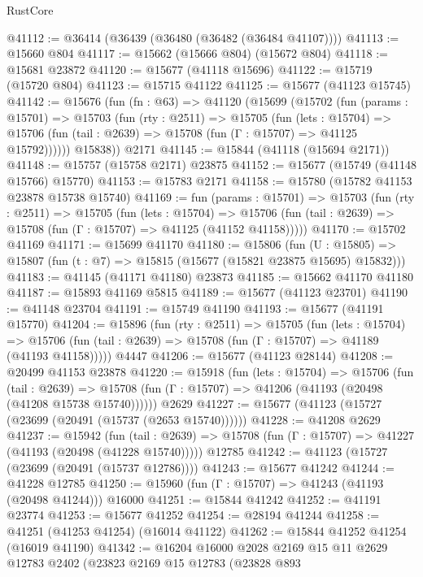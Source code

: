 \begin{lexlean}{RustCore}
\begin{coremodule}
@41112 := @36414 (@36439 (@36480 (@36482 (@36484 @41107))))
@41113 := @15660 @804
@41117 := @15662 (@15666 @804) (@15672 @804)
@41118 := @15681 @23872
@41120 := @15677 (@41118 @15696)
@41122 := @15719 (@15720 @804)
@41123 := @15715 @41122
@41125 := @15677 (@41123 @15745)
@41142 := @15676
    (fun (fn : @63) =>
    @41120
      (@15699
        (@15702
          (fun (params : @15701) =>
          @15703
            (fun (rty : @2511) =>
            @15705
              (fun (lets : @15704) =>
              @15706 (fun (tail : @2639) => @15708 (fun (Γ : @15707) => @41125 @15792))))))
        @15838))
    @2171
@41145 := @15844 (@41118 (@15694 @2171))
@41148 := @15757 (@15758 @2171) @23875
@41152 := @15677 (@15749 (@41148 @15766) @15770)
@41153 := @15783 @2171
@41158 := @15780 (@15782 @41153 @23878 @15738 @15740)
@41169 := fun (params : @15701) =>
  @15703
    (fun (rty : @2511) =>
    @15705
      (fun (lets : @15704) =>
      @15706 (fun (tail : @2639) => @15708 (fun (Γ : @15707) => @41125 (@41152 @41158)))))
@41170 := @15702 @41169
@41171 := @15699 @41170
@41180 := @15806
    (fun (U : @15805) => @15807 (fun (t : @7) => @15815 (@15677 (@15821 @23875 @15695) @15832)))
@41183 := @41145 (@41171 @41180) @23873
@41185 := @15662 @41170 @41180
@41187 := @15893 @41169 @5815
@41189 := @15677 (@41123 @23701)
@41190 := @41148 @23704
@41191 := @15749 @41190
@41193 := @15677 (@41191 @15770)
@41204 := @15896
    (fun (rty : @2511) =>
    @15705
      (fun (lets : @15704) =>
      @15706 (fun (tail : @2639) => @15708 (fun (Γ : @15707) => @41189 (@41193 @41158)))))
    @4447
@41206 := @15677 (@41123 @28144)
@41208 := @20499 @41153 @23878
@41220 := @15918
    (fun (lets : @15704) =>
    @15706
      (fun (tail : @2639) =>
      @15708 (fun (Γ : @15707) => @41206 (@41193 (@20498 (@41208 @15738 @15740))))))
    @2629
@41227 := @15677 (@41123 (@15727 (@23699 (@20491 (@15737 (@2653 @15740))))))
@41228 := @41208 @2629
@41237 := @15942
    (fun (tail : @2639) => @15708 (fun (Γ : @15707) => @41227 (@41193 (@20498 (@41228 @15740)))))
    @12785
@41242 := @41123 (@15727 (@23699 (@20491 (@15737 @12786))))
@41243 := @15677 @41242
@41244 := @41228 @12785
@41250 := @15960 (fun (Γ : @15707) => @41243 (@41193 (@20498 @41244))) @16000
@41251 := @15844 @41242
@41252 := @41191 @23774
@41253 := @15677 @41252
@41254 := @28194 @41244
@41258 := @41251 (@41253 @41254) (@16014 @41122)
@41262 := @15844 @41252 @41254 (@16019 @41190)
@41342 := @16204
    @16000
    @2028
    @2169
    @15
    @11
    @2629
    @12783
    @2402
    (@23823
      @2169
      @15
      @12783
      (@23828
        @893

\end{coremodule}
\end{lexlean}

